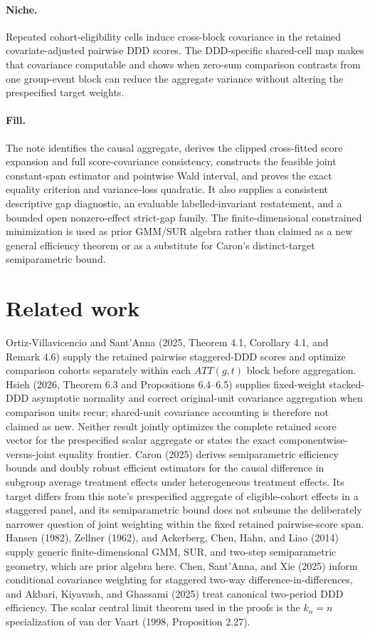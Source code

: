 \documentclass{article}
\begin{document}
\paragraph{Niche.} Repeated cohort-eligibility cells induce cross-block covariance in the retained covariate-adjusted pairwise DDD scores. The DDD-specific shared-cell map makes that covariance computable and shows when zero-sum comparison contrasts from one group-event block can reduce the aggregate variance without altering the prespecified target weights.

\paragraph{Fill.} The note identifies the causal aggregate, derives the clipped cross-fitted score expansion and full score-covariance consistency, constructs the feasible joint constant-span estimator and pointwise Wald interval, and proves the exact equality criterion and variance-loss quadratic. It also supplies a consistent descriptive gap diagnostic, an evaluable labelled-invariant restatement, and a bounded open nonzero-effect strict-gap family. The finite-dimensional constrained minimization is used as prior GMM/SUR algebra rather than claimed as a new general efficiency theorem or as a substitute for Caron's distinct-target semiparametric bound.

\section{Related work}

Ortiz-Villavicencio and Sant'Anna (2025, Theorem 4.1, Corollary 4.1, and Remark 4.6) supply the retained pairwise staggered-DDD scores and optimize comparison cohorts separately within each \(ATT(g,t)\) block before aggregation. Hsieh (2026, Theorem 6.3 and Propositions 6.4--6.5) supplies fixed-weight stacked-DDD asymptotic normality and correct original-unit covariance aggregation when comparison units recur; shared-unit covariance accounting is therefore not claimed as new. Neither result jointly optimizes the complete retained score vector for the prespecified scalar aggregate or states the exact componentwise-versus-joint equality frontier. Caron (2025) derives semiparametric efficiency bounds and doubly robust efficient estimators for the causal difference in subgroup average treatment effects under heterogeneous treatment effects. Its target differs from this note's prespecified aggregate of eligible-cohort effects in a staggered panel, and its semiparametric bound does not subsume the deliberately narrower question of joint weighting within the fixed retained pairwise-score span. Hansen (1982), Zellner (1962), and Ackerberg, Chen, Hahn, and Liao (2014) supply generic finite-dimensional GMM, SUR, and two-step semiparametric geometry, which are prior algebra here. Chen, Sant'Anna, and Xie (2025) inform conditional covariance weighting for staggered two-way difference-in-differences, and Akbari, Kiyavash, and Ghassami (2025) treat canonical two-period DDD efficiency. The scalar central limit theorem used in the proofs is the \(k_n=n\) specialization of van der Vaart (1998, Proposition 2.27).
\end{document}
